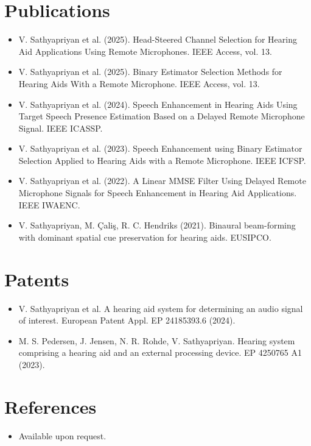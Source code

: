 \documentclass[11pt,a4paper,sans]{moderncv}
\begin{document}

\section{Publications}
\vspace{1pt}
\begin{itemize}
\item V. Sathyapriyan et al. (2025). Head-Steered Channel Selection for Hearing Aid Applications Using Remote Microphones. IEEE Access, vol. 13.
\item V. Sathyapriyan et al. (2025). Binary Estimator Selection Methods for Hearing Aids With a Remote Microphone. IEEE Access, vol. 13.
\item V. Sathyapriyan et al. (2024). Speech Enhancement in Hearing Aids Using Target Speech Presence Estimation Based on a Delayed Remote Microphone Signal. IEEE ICASSP.
\item V. Sathyapriyan et al. (2023). Speech Enhancement using Binary Estimator Selection Applied to Hearing Aids with a Remote Microphone. IEEE ICFSP.
\item V. Sathyapriyan et al. (2022). A Linear MMSE Filter Using Delayed Remote Microphone Signals for Speech Enhancement in Hearing Aid Applications. IEEE IWAENC.
\item V. Sathyapriyan, M. Çaliş, R. C. Hendriks (2021). Binaural beam-forming with dominant spatial cue preservation for hearing aids. EUSIPCO.
\end{itemize}


\section{Patents}
\vspace{1pt}
\begin{itemize}
\item V. Sathyapriyan et al. A hearing aid system for determining an audio signal of interest. European Patent Appl. EP 24185393.6 (2024).
\item M. S. Pedersen, J. Jensen, N. R. Rohde, V. Sathyapriyan. Hearing system comprising a hearing aid and an external processing device. EP 4250765 A1 (2023).
\end{itemize}


\section{References}
\vspace{1pt}
\begin{itemize}
\item{Available upon request.}
\end{itemize}
\end{document}
